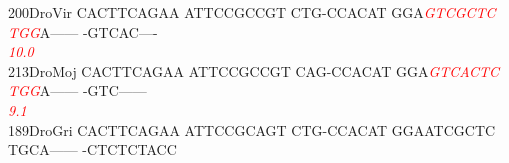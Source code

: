 \documentclass[11pt,twoside,reqno,a4paper]{article}
\begin{document}
{200\hspace*{1\charwidth}DroVir	CACTTCAGAA	ATTCCGCCGT	CTG-CCACAT	GGA\textit{\textcolor{Red}{G}}\textit{\textcolor{Red}{T}}\textit{\textcolor{Red}{C}}\textit{\textcolor{Red}{G}}\textit{\textcolor{Red}{C}}\textit{\textcolor{Red}{T}}\textit{\textcolor{Red}{C}}	\textit{\textcolor{Red}{T}}\textit{\textcolor{Red}{G}}\textit{\textcolor{Red}{G}}A------	-GTCAC----	\\
\hspace*{4\charwidth}\hspace*{7\charwidth}\hspace*{1\charwidth}\hspace*{1\charwidth}\hspace*{1\charwidth}\hspace*{33\charwidth}\textit{\textcolor{Red}{10.0}}\hspace*{1\charwidth}\hspace*{1\charwidth}\hspace*{1\charwidth}\\
213\hspace*{1\charwidth}DroMoj	CACTTCAGAA	ATTCCGCCGT	CAG-CCACAT	GGA\textit{\textcolor{Red}{G}}\textit{\textcolor{Red}{T}}\textit{\textcolor{Red}{C}}\textit{\textcolor{Red}{A}}\textit{\textcolor{Red}{C}}\textit{\textcolor{Red}{T}}\textit{\textcolor{Red}{C}}	\textit{\textcolor{Red}{T}}\textit{\textcolor{Red}{G}}\textit{\textcolor{Red}{G}}A------	-GTC------	\\
\hspace*{4\charwidth}\hspace*{7\charwidth}\hspace*{1\charwidth}\hspace*{1\charwidth}\hspace*{1\charwidth}\hspace*{33\charwidth}\textit{\textcolor{Red}{9.1}}\hspace*{1\charwidth}\hspace*{1\charwidth}\hspace*{1\charwidth}\\
189\hspace*{1\charwidth}DroGri	CACTTCAGAA	ATTCCGCAGT	CTG-CCACAT	GGAATCGCTC	TGCA------	-CTCTCTACC	\\
\hspace*{4\charwidth}\hspace*{7\charwidth}\hspace*{1\charwidth}\hspace*{1\charwidth}\hspace*{1\charwidth}\hspace*{1\charwidth}\hspace*{1\charwidth}\hspace*{1\charwidth}\\
}
\end{document}
